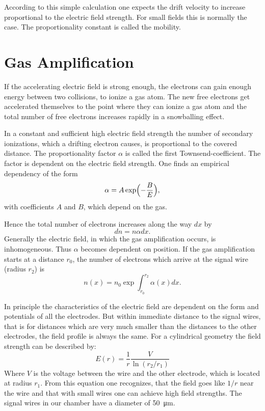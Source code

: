 \documentclass[12pt]{article}
\begin{document}
According to this simple calculation one expects the drift velocity to increase proportional to the electric field strength. For small fields this is normally the case. The proportionality constant is called the mobility.

\section{Gas Amplification}

If the accelerating electric field is strong enough, the electrons can gain enough energy between two collisions, to ionize a gas atom. The new free electrons get accelerated themselves to the point where they can ionize a gas atom and the total number of free electrons increases rapidly in a snowballing effect. 

In a constant and sufficient high electric field strength the number of secondary ionizations, which a drifting electron causes, is proportional to the covered distance. The proportionality factor $\alpha$ is called the first Townsend-coefficient. The factor is dependent on the electric field strength. One finds an empirical dependency of the form
\begin{equation}
\alpha = A \exp \Bigl( - \frac{B}{E} \Bigr),
\label{eq:townsend}
\end{equation}
with coefficients $A$ and $B$, which depend on the gas. 

Hence the total number of electrons increases along the way $dx$ by
\begin{equation}
dn = n \alpha dx.
\end{equation}
Generally the electric field, in which the gas amplification occurs, is inhomogeneous. Thus $\alpha$ becomes dependent on position. If the gas amplification starts at a distance $r_0$, the number of electrons which arrive at the signal wire (radius $r_2$) is 
\begin{equation}
n(x) = n_0 \exp \int_{r_0}^{r_2} \alpha(x) dx.
\end{equation}

In principle the characteristics of the electric field are dependent on the form and potentials of all the electrodes. But within immediate distance to the signal wires, that is for distances which are very much smaller than  the distances to the other electrodes, the field profile is always the same. For a cylindrical geometry the field strength can be described by:
\begin{equation}
E(r) = \frac{1}{r} \frac{V}{\ln (r_2/r_1)}
\end{equation}
Where $V$ is the voltage between the wire and the other electrode, which is located at radius $r_1$. From this equation one recognizes, that the field goes like $1/r$ near the wire and that with small wires one can achieve high field strengths. The signal wires in our chamber have a diameter of \SI{50}{\micro\meter}.
\end{document}
